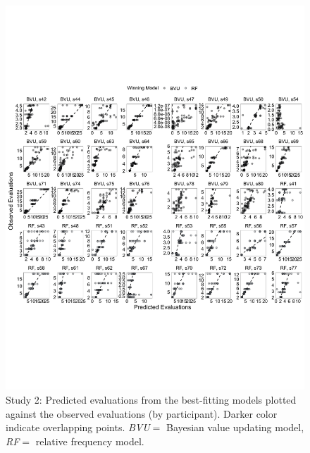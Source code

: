 \documentclass[
  a4paper, man, floatsintext]{apa6}
\begin{document}
\begin{figure}[htb]

{\centering \includegraphics[width=\textwidth]{../figures/fig5-1} 

}

\caption{Study 2: Predicted evaluations from the best-fitting models plotted against the observed evaluations (by participant). Darker color indicate overlapping points. \textit{BVU}$=$ Bayesian value updating model, \textit{RF}$=$ relative frequency model.}\label{fig:fig5}
\end{figure}
\end{document}
